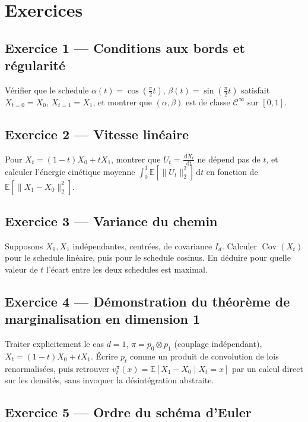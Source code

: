 \documentclass[11pt,a4paper]{article}
\theoremstyle{definition}
\theoremstyle{plain}
\theoremstyle{remark}
\newcommand{\E}{\mathbb{E}}
\newcommand{\dd}{\,\mathrm{d}}
\DeclareMathOperator{\Cov}{Cov}
\begin{document}
\section{Exercices}

\subsection*{Exercice 1 --- Conditions aux bords et régularité}

Vérifier que le schedule $\alpha(t)=\cos(\tfrac{\pi}{2}t)$,
$\beta(t)=\sin(\tfrac{\pi}{2}t)$ satisfait $X_{t=0}=X_0$, $X_{t=1}=X_1$, et
montrer que $(\alpha,\beta)$ est de classe $\mathcal{C}^\infty$ sur $[0,1]$.

\subsection*{Exercice 2 --- Vitesse linéaire}

Pour $X_t=(1-t)X_0+tX_1$, montrer que $U_t=\frac{\dd X_t}{\dd t}$ ne dépend pas
de $t$, et calculer l'énergie cinétique moyenne
$\int_0^1 \E[\|U_t\|_2^2]\dd t$ en fonction de $\E[\|X_1-X_0\|_2^2]$.

\subsection*{Exercice 3 --- Variance du chemin}

Supposons $X_0,X_1$ indépendantes, centrées, de covariance $I_d$. Calculer
$\Cov(X_t)$ pour le schedule linéaire, puis pour le schedule cosinus. En déduire
pour quelle valeur de $t$ l'écart entre les deux schedules est maximal.

\subsection*{Exercice 4 --- Démonstration du théorème de marginalisation en dimension 1}

Traiter explicitement le cas $d=1$, $\pi=p_0\otimes p_1$ (couplage indépendant),
$X_t=(1-t)X_0+tX_1$. Écrire $p_t$ comme un produit de convolution de lois
renormalisées, puis retrouver $v_t^\pi(x)=\E[X_1-X_0\mid X_t=x]$ par un calcul
direct sur les densités, sans invoquer la désintégration abstraite.

\subsection*{Exercice 5 --- Ordre du schéma d'Euler}
\end{document}
